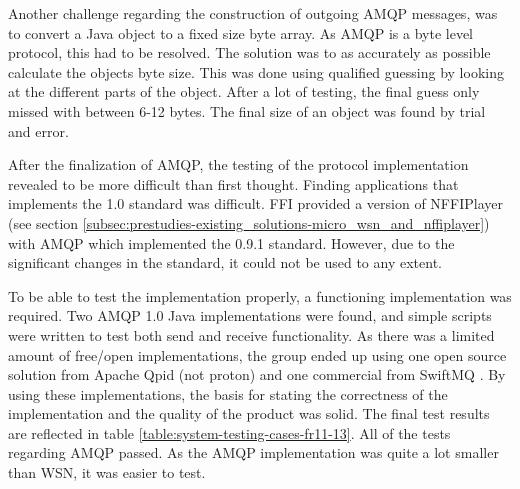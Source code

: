Another challenge regarding the construction of outgoing AMQP messages, was to convert a Java object to a fixed size byte array. As AMQP is a byte level protocol, this had to be resolved. The solution was to as accurately as possible calculate the objects byte size. This was done using qualified guessing by looking at the different parts of the object. After a lot of testing, the final guess only missed with between 6-12 bytes. The final size of an object was found by trial and error. 

After the finalization of AMQP, the testing of the protocol implementation revealed to be more difficult than first thought. Finding applications that implements the 1.0 standard was difficult. FFI provided a version of NFFIPlayer (see section \ref{subsec:prestudies-existing_solutions-micro_wsn_and_nffiplayer}) with AMQP which implemented the 0.9.1 standard. However, due to the significant changes in the standard, it could not be used to any extent.

To be able to test the implementation properly, a functioning implementation was required. Two AMQP 1.0 Java implementations were found, and simple scripts were written to test both send and receive functionality. As there was a limited amount of free/open implementations, the group ended up using one open source solution from Apache Qpid (not proton) \cite{apache-qpid} and one commercial from SwiftMQ \cite{swift-mq}. By using these implementations, the basis for stating the correctness of the implementation and the quality of the product was solid. The final test results are reflected in table \ref{table:system-testing-cases-fr11-13}. All of the tests regarding AMQP passed. As the AMQP implementation was quite a lot smaller than WSN, it was easier to test.
